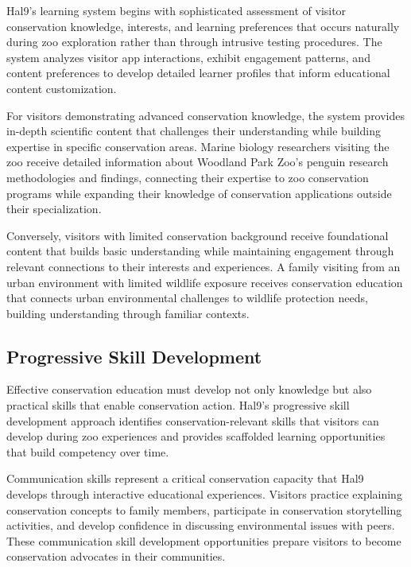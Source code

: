\documentclass[
  Letterpaper,
]{scrbook}
\begin{document}
Hal9's learning system begins with sophisticated assessment of visitor
conservation knowledge, interests, and learning preferences that occurs
naturally during zoo exploration rather than through intrusive testing
procedures. The system analyzes visitor app interactions, exhibit
engagement patterns, and content preferences to develop detailed learner
profiles that inform educational content customization.

For visitors demonstrating advanced conservation knowledge, the system
provides in-depth scientific content that challenges their understanding
while building expertise in specific conservation areas. Marine biology
researchers visiting the zoo receive detailed information about Woodland
Park Zoo's penguin research methodologies and findings, connecting their
expertise to zoo conservation programs while expanding their knowledge
of conservation applications outside their specialization.

Conversely, visitors with limited conservation background receive
foundational content that builds basic understanding while maintaining
engagement through relevant connections to their interests and
experiences. A family visiting from an urban environment with limited
wildlife exposure receives conservation education that connects urban
environmental challenges to wildlife protection needs, building
understanding through familiar contexts.

\subsection{Progressive Skill
Development}\label{progressive-skill-development}

Effective conservation education must develop not only knowledge but
also practical skills that enable conservation action. Hal9's
progressive skill development approach identifies conservation-relevant
skills that visitors can develop during zoo experiences and provides
scaffolded learning opportunities that build competency over time.

Communication skills represent a critical conservation capacity that
Hal9 develops through interactive educational experiences. Visitors
practice explaining conservation concepts to family members, participate
in conservation storytelling activities, and develop confidence in
discussing environmental issues with peers. These communication skill
development opportunities prepare visitors to become conservation
advocates in their communities.
\end{document}
